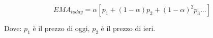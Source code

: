 \documentclass[a4paper]{article}
\begin{document}
$$ EMA_{today}=\alpha[p_1+(1-\alpha)p_2+(1-\alpha)^2p_3...] $$

Dove: $ p_1 $ è il prezzo di oggi, $ p_2 $ è il prezzo di ieri.
\end{document}

